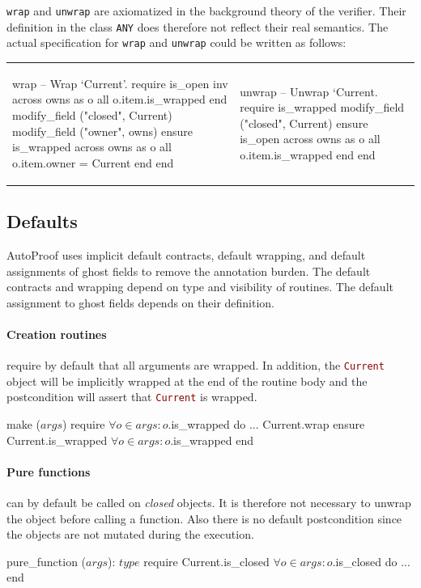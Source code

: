 \documentclass[a4paper,12pt]{article}
\newcommand{\AutoProof}{Auto\-Proof\xspace}
\newcommand{\e}[1]{\mbox{\lstinline[language=Eiffel]|#1|}}
\begin{document}
\e{wrap} and \e{unwrap} are axiomatized in the background theory of the verifier. Their definition in the class \e{ANY} does therefore not reflect their real semantics. The actual specification for \e{wrap} and \e{unwrap} could be written as follows:

\noindent\begin{tabular}{ll}
{\begin{erunning}[basicstyle=\scriptsize,numbers=left]
wrap
		-- Wrap `Current'.
	require
		is_open
		inv
		across owns as o all o.item.is_wrapped end
		modify_field ("closed", Current)
		modify_field ("owner", owns)
	ensure
		is_wrapped
		across owns as o all o.item.owner = Current end
	end
\end{erunning}}
&
\hspace{4mm}
{\begin{erunning}[basicstyle=\scriptsize,numbers=left,firstnumber=last]
unwrap
		-- Unwrap `Current.
	require
		is_wrapped
		modify_field ("closed", Current)
	ensure
		is_open
		across owns as o all 
		       o.item.is_wrapped end
	end
\end{erunning}}
\end{tabular}


\subsection{Defaults}

\AutoProof uses implicit default contracts, default wrapping, and default assignments of ghost fields to remove the annotation burden. The default contracts and wrapping depend on type and visibility of routines. The default assignment to ghost fields depends on their definition.

\paragraph{Creation routines} require by default that all arguments are wrapped. In addition, the \e{Current} object will be implicitly wrapped at the end of the routine body and the postcondition will assert that \e{Current} is wrapped.
\begin{erunning}
make ($args$)
	require
		$\forall o\in args : o$.is_wrapped
	do
		...
		Current.wrap
	ensure
		Current.is_wrapped
		$\forall o\in args : o$.is_wrapped
	end
\end{erunning}

\paragraph{Pure functions} can by default be called on \emph{closed} objects. It is therefore not necessary to unwrap the object before calling a function. Also there is no default postcondition since the objects are not mutated during the execution.
\begin{erunning}
pure_function ($args$): $type$
	require
		Current.is_closed
		$\forall o\in args : o$.is_closed
	do ...	end
\end{erunning}
\end{document}
